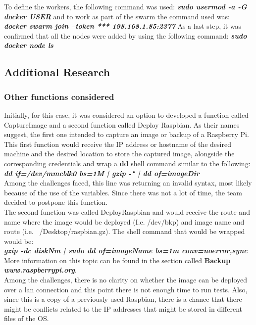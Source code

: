	To define the workers, the following command was used:
  \textbf{\textit{sudo usermod -a -G docker USER}} 
  and to work as part of the swarm the command used was:\\
	 \textbf{\textit{docker swarm join --token *** 198.168.1.85:2377}}
	As a last step, it was confirmed that all the nodes were 
  added by using the following command: 	
  \textbf{\textit{sudo docker node ls}}
	
	\subsection{Additional Research}
	
	\subsubsection{Other functions considered}
	Initially, for this case, it was considered an option to 
  developed a function called CaptureImage and a second 
  function called Deploy Raspbian.
	As their names suggest, the first one intended to capture
  an image or backup of a Raspberry Pi.
	This first function would receive the IP address or 
  hostname of the desired machine and the desired location 
  to store the captured image, alongside the corresponding credentials and wrap 
  a \textbf{dd} shell command similar to the following:\\ 
	\textbf{\textit{dd if=/dev/mmcblk0 bs=1M | gzip -" | dd of=imageDir}}\\
	Among the challenges faced, this line was returning an
  invalid syntax, most likely because of the use of the variables. 
  Since there was not a lot of time, the team decided to
  postpone this function.\\
	
	The second function was called DeployRaspbian and would
  receive the route and name where the image would be
  deployed (I.e. /dev/bkp) and image name and 
  route (i.e. ~/Desktop/raspbian.gz). The shell command 
  that would be wrapped would be: \\
	\textbf{\textit{gzip -dc diskNm | sudo dd of=imageName bs=1m conv=noerror,sync}}\\

	More information on this topic can be found in the section 
  called \textbf{Backup} \textbf{\textit{www.raspberrypi.org}}.\\
	
	Among the challenges, there is no clarity on whether the 
  image can be deployed over a lan connection and this point 
  there is not enough time to run tests.
	Also, since this is a copy of a previously used Raspbian, 
  there is a chance that there might be conflicts related to the 
  IP addresses that might be stored in different files of the OS. 
	
